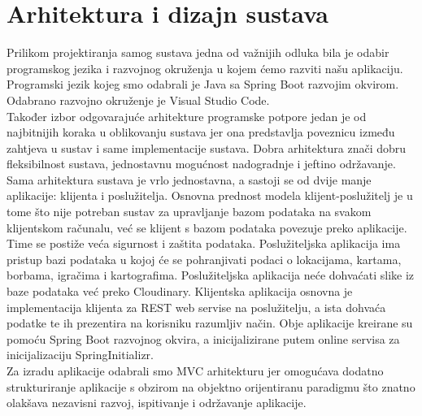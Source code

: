 \chapter{Arhitektura i dizajn sustava}
		


		{Prilikom projektiranja samog sustava jedna od važnijih odluka bila je odabir programskog jezika i razvojnog okruženja u kojem ćemo razviti našu aplikaciju. Programski jezik kojeg smo odabrali je Java sa Spring Boot razvojim okvirom. Odabrano razvojno okruženje je Visual Studio Code.}	\\
		{Također izbor odgovarajuće arhitekture programske potpore jedan je od najbitnijih koraka u oblikovanju sustava jer ona predstavlja poveznicu između zahtjeva u sustav i same implementacije sustava. Dobra arhitektura znači dobru fleksibilnost sustava, jednostavnu mogućnost nadogradnje i jeftino održavanje.}\\
		{Sama arhitektura sustava je vrlo jednostavna, a sastoji se od dvije manje aplikacije: klijenta i poslužitelja. Osnovna prednost modela klijent-poslužitelj je u tome što nije potreban sustav za upravljanje bazom podataka na svakom klijentskom računalu, već se klijent s bazom podataka povezuje preko aplikacije. Time se postiže veća sigurnost i zaštita podataka. Poslužiteljska aplikacija ima pristup bazi podataka u kojoj će se pohranjivati podaci o lokacijama, kartama, borbama, igračima i kartografima. Poslužiteljska aplikacija neće dohvaćati slike iz baze podataka već preko Cloudinary. Klijentska aplikacija osnovna je implementacija klijenta za REST web servise na poslužitelju, a ista dohvaća podatke te ih prezentira na korisniku razumljiv način. Obje aplikacije kreirane su pomoću Spring Boot razvojnog okvira, a inicijalizirane putem online servisa za inicijalizaciju SpringInitializr.}\\
		{Za izradu aplikacije odabrali smo MVC arhitekturu jer omogućava dodatno strukturiranje aplikacije s obzirom na objektno orijentiranu paradigmu što znatno olakšava nezavisni razvoj, ispitivanje i održavanje aplikacije.}		

